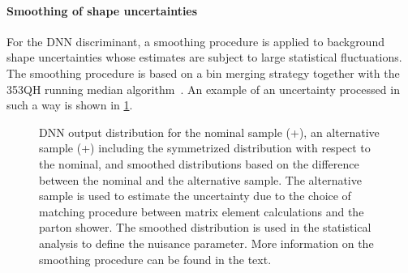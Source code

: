 \paragraph{Smoothing of shape uncertainties}
For the DNN discriminant, a smoothing procedure is applied to background shape uncertainties whose estimates are subject to large statistical fluctuations. 
The smoothing procedure is based on a bin merging strategy together with the 353QH running median algorithm~\cite{Friedman353QH}. 
An example of an uncertainty processed in such a way is shown in \cref{fig:dnn:smoothing}.
\begin{figure}[th]
    \centering
    {\caption[DNN output distribution for the nominal and an alternative \ttbar sample.]{DNN output distribution for the nominal \ttbar sample (\Powheg+\PYTHIA[8]), an alternative sample (\aMCATNLO+\PYTHIA[8]) including the symmetrized distribution with respect to the nominal, and smoothed distributions based on the difference between the nominal and the alternative sample. The alternative sample is used to estimate the uncertainty due to the choice of matching procedure between matrix element calculations and the parton shower. The smoothed distribution is used in the statistical analysis to define the nuisance parameter. More information on the smoothing procedure can be found in the text.
    \label{fig:dnn:smoothing} }}
\end{figure}

